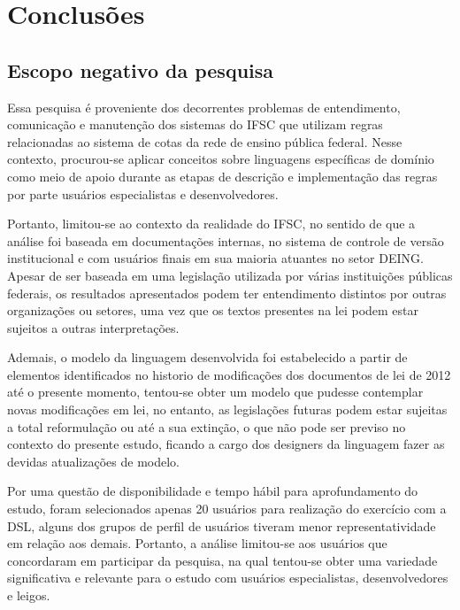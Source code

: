 \chapter{Conclusões}
\label{chap:consideracoes}



\section{Escopo negativo da pesquisa}
\label{escoponegativo}

Essa pesquisa é proveniente dos decorrentes problemas de entendimento, comunicação e manutenção dos sistemas do \gls{IFSC} que utilizam regras relacionadas ao sistema de cotas da rede de ensino pública federal. Nesse contexto, procurou-se aplicar conceitos sobre linguagens específicas de domínio como meio de apoio durante as etapas de descrição e implementação das regras por parte usuários especialistas e desenvolvedores. 

Portanto, limitou-se ao contexto da realidade do \gls{IFSC}, no sentido de que a análise foi baseada em documentações internas, no sistema de controle de versão institucional e com usuários finais em sua maioria atuantes no setor \gls{DEING}. Apesar de ser baseada em uma legislação utilizada por várias instituições públicas federais, os resultados apresentados podem ter entendimento distintos por outras organizações ou setores, uma vez que os textos presentes na lei podem estar sujeitos a outras interpretações. 

Ademais, o modelo da linguagem desenvolvida foi estabelecido a partir de elementos identificados no historio de modificações dos documentos de lei de 2012 até o presente momento, tentou-se obter um modelo que pudesse contemplar novas modificações em lei, no entanto, as legislações futuras podem estar sujeitas a total reformulação ou até a sua extinção, o que não pode ser previso no contexto do presente estudo, ficando a cargo dos designers da linguagem fazer as devidas atualizações de modelo.

Por uma questão de disponibilidade e tempo hábil para aprofundamento do estudo, foram selecionados apenas 20 usuários para realização do exercício com a DSL, alguns dos grupos de perfil de usuários tiveram menor representatividade em relação aos demais. Portanto, a análise limitou-se aos usuários que concordaram em participar da pesquisa, na qual tentou-se obter uma variedade significativa e relevante para o estudo com usuários especialistas, desenvolvedores e leigos.

